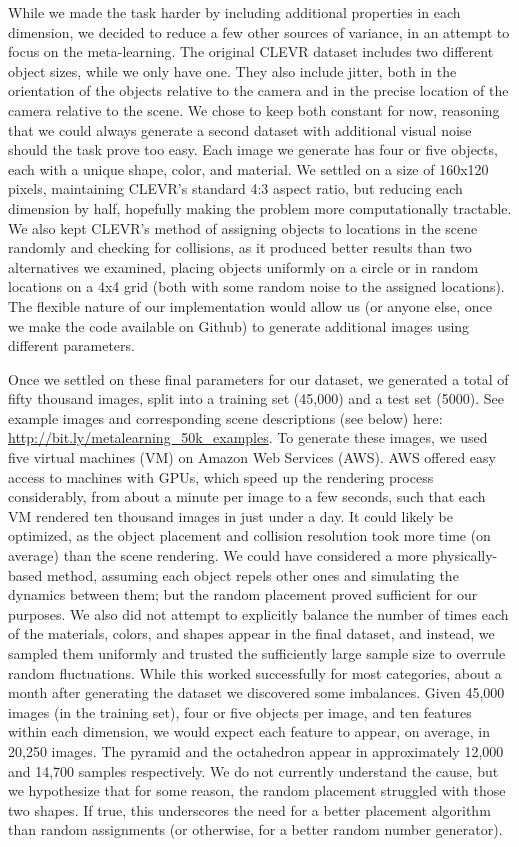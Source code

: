 While we made the task harder by including additional properties in each dimension, we decided to reduce a few other sources of variance, in an attempt to focus on the meta-learning. The original CLEVR dataset includes two different object sizes, while we only have one. They also include jitter, both in the orientation of the objects relative to the camera and in the precise location of the camera relative to the scene. We chose to keep both constant for now, reasoning that we could always generate a second dataset with additional visual noise should the task prove too easy. Each image we generate has four or five objects, each with a unique shape, color, and material. We settled on a size of 160x120 pixels, maintaining CLEVR’s standard 4:3 aspect ratio, but reducing each dimension by half, hopefully making the problem more computationally tractable. We also kept CLEVR’s method of assigning objects to locations in the scene randomly and checking for collisions, as it produced better results than two alternatives we examined, placing objects uniformly on a circle or in random locations on a 4x4 grid (both with some random noise to the assigned locations). The flexible nature of our implementation would allow us (or anyone else, once we make the code available on Github) to generate additional images using different parameters.

Once we settled on these final parameters for our dataset, we generated a total of fifty thousand images, split into a training set (45,000) and a test set (5000). See example images and corresponding scene descriptions (see below) here: \url{http://bit.ly/metalearning_50k_examples}. To generate these images, we used five virtual machines (VM) on Amazon Web Services (AWS). AWS offered easy access to machines with GPUs, which speed up the rendering process considerably, from about a minute per image to a few seconds, such that each VM rendered ten thousand images in just under a day. It could likely be optimized, as the object placement and collision resolution took more time (on average) than the scene rendering. We could have considered a more physically-based method, assuming each object repels other ones and simulating the dynamics between them; but the random placement proved sufficient for our purposes. We also did not attempt to explicitly balance the number of times each of the materials, colors, and shapes appear in the final dataset, and instead, we sampled them uniformly and trusted the sufficiently large sample size to overrule random fluctuations. While this worked successfully for most categories, about a month after generating the dataset we discovered some imbalances. Given 45,000 images (in the training set), four or five objects per image, and ten features within each dimension, we would expect each feature to appear, on average, in 20,250 images. The pyramid and the octahedron appear in approximately 12,000 and 14,700 samples respectively. We do not currently understand the cause, but we hypothesize that for some reason, the random placement struggled with those two shapes. If true, this underscores the need for a better placement algorithm than random assignments (or otherwise, for a better random number generator). 

